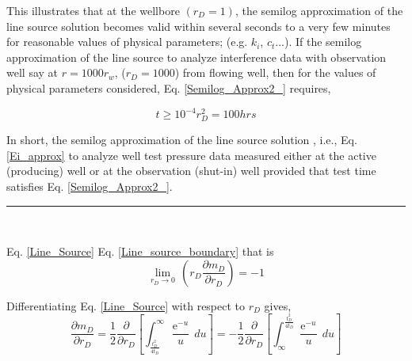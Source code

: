 \documentclass{llncs}
\numberwithin{equation}{section}
\numberwithin{figure}{section}
\numberwithin{table}{section}
\begin{document}
    This  illustrates that at the wellbore $(r_{D}=1)$, the semilog approximation of the line source solution becomes valid within several seconds to a very few minutes for reasonable values of physical parameters; (e.g. $k_{i}$, $c_{t}$...). If  the semilog approximation of the line source  to analyze  interference data with  observation well say at $r=1000r_{w}$, ($r_{D}=1000$)  from  flowing well, then for the values of physical parameters considered, Eq. \ref{Semilog_Approx2_} requires,

    \begin{equation*}
        t\geq10^{-4}{r_{D}^{2}}=100 hrs
    \end{equation*}

    In short, the semilog approximation of the line source solution , i.e., Eq. \ref{Ei_approx} to analyze well test pressure data measured either at the active (producing) well or at the observation (shut-in) well provided that test time satisfies Eq. \ref{Semilog_Approx2_}.\\
    \rule{\textwidth}{1pt}\\
    \vspace{15pt}

     Eq. \ref{Line_Source}  Eq. \ref{Line_source_boundary} that is
    \begin{equation*}
    \underset{{{r}_{D}}\to 0}{\mathop{\lim }}\,\left( {{r}_{D}}\frac{\partial {{m}_{D}}}{\partial {{r}_{D}}} \right)=-1
    \end{equation*}

    Differentiating Eq. \ref{Line_Source} with respect to $r_{D}$ gives,
    \begin{equation}
    \frac{\partial {{ m }_{D}}}{\partial {{r}_{D}}}=\frac{1}{2}\frac{\partial }{\partial {{r}_{D}}}\left[ \int_{\frac{t_{D}^{2}}{4{{t}_{D}}}}^{\infty }{\frac{{{\operatorname{e}}^{-u}}}{u}}\,du \right]=-\frac{1}{2}\frac{\partial }{\partial {{r}_{D}}}\left[ \int_{\infty }^{\frac{t_{D}^{2}}{4{{t}_{D}}}}{\frac{{{\operatorname{e}}^{-u}}}{u}}\,du \right]
        \label{Line_Solution_dif_rD}
    \end{equation}
\end{document}
